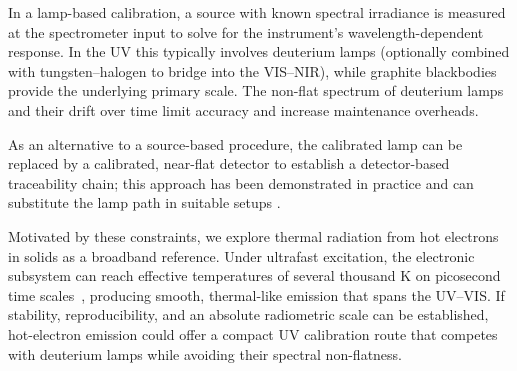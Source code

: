 \documentclass[
	parskip=half,
	a4paper,
]{scrarticle}
\begin{document}
In a lamp-based calibration, a source with known spectral irradiance is measured at the spectrometer input to solve for the instrument’s wavelength-dependent response. In the UV this typically involves deuterium lamps (optionally combined with tungsten–halogen to bridge into the VIS–NIR), while graphite blackbodies provide the underlying primary scale. The non-flat spectrum of deuterium lamps and their drift over time limit accuracy and increase maintenance overheads.

As an alternative to a source-based procedure, the calibrated lamp can be replaced by a calibrated, near-flat detector to establish a detector-based traceability chain; this approach has been demonstrated in practice and can substitute the lamp path in suitable setups \cite{larason_nist_1996}.

Motivated by these constraints, we explore thermal radiation from hot electrons in solids as a broadband reference. Under ultrafast excitation, the electronic subsystem can reach effective temperatures of several thousand \si{\kelvin} on picosecond time scales~\cite{lui_ultrafast_2010}, producing smooth, thermal-like emission that spans the UV–VIS. If stability, reproducibility, and an absolute radiometric scale can be established, hot-electron emission could offer a compact UV calibration route that competes with deuterium lamps while avoiding their spectral non-flatness.
\end{document}
